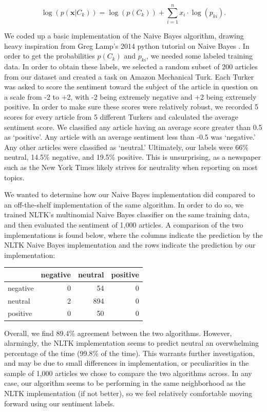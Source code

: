 \documentclass[fleqn,12pt]{SelfArx} %
\begin{document}
\begin{equation}
\log(p(\mathbf{x}|C_k)) = \log ( p(C_k)) + \sum_{i=1}^n x_i \cdot \log(p_{ki}).
\end{equation}

We coded up a basic implementation of the Naive Bayes algorithm, drawing heavy inspiration from Greg Lamp's 2014 python tutorial on Naive Bayes \cite{NaiveBayes}. In order to get the probabilities $p(C_k)$ and $p_{ki}$, we needed some labeled training data. In order to obtain these labels, we selected a random subset of 200 articles from our dataset and created a task on Amazon Mechanical Turk. Each Turker was asked to score the sentiment toward the subject of the article in question on a scale from -2 to +2, with -2 being extremely negative and +2 being extremely positive. In order to make sure these scores were relatively robust, we recorded 5 scores for every article from 5 different Turkers and calculated the average sentiment score. We classified any article having an average score greater than 0.5 as `positive'. Any article with an average sentiment less than -0.5 was `negative.' Any other articles were classified as `neutral.' Ultimately, our labels were 66\% neutral, 14.5\% negative, and 19.5\% positive. This is unsurprising, as a newspaper such as the New York Times likely strives for neutrality when reporting on most topics.

We wanted to determine how our Naive Bayes implementation did compared to an off-the-shelf implementation of the same algorithm. In order to do so, we trained NLTK's multinomial Naive Bayes classifier on the same training data, and then evaluated the sentiment of 1,000 articles. A comparison of the two implementations is found below, where the columns indicate the prediction by the NLTK Naive Bayes implementation and the rows indicate the prediction by our implementation:

\vspace{10 mm}

\begin{tabular}{l | r r r}
\toprule
  & negative & neutral & positive\\
\midrule
negative & 0 & 54 & 0\\
neutral & 2 & 894 & 0\\
positive & 0 & 50 & 0\\
\bottomrule
\end{tabular}

\vspace{10 mm}

Overall, we find 89.4\% agreement between the two algorithms. However, alarmingly, the NLTK implementation seems to predict neutral an overwhelming percentage of the time (99.8\% of the time). This warrants further investigation, and may be due to small differences in implementation, or peculiarities in the sample of 1,000 articles we chose to compare the two algorithms across. In any case, our algorithm seems to be performing in the same neighborhood as the NLTK implementation (if not better), so we feel relatively comfortable moving forward using our sentiment labels.
\end{document}
